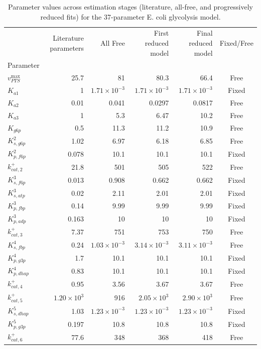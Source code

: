 \begin{table}
\caption{Parameter values across estimation stages (literature, all-free, and progressively reduced fits) for the 37-parameter E. coli glycolysis model.}
\label{tab:param_evolution}
\begin{tabular}{lrrrrc}
\toprule
 & Literature parameters & All Free & First reduced model & Final reduced model & Fixed/Free \\
Parameter &  &  &  &  &  \\
\midrule
$v^{\max}_{PTS}$ & 25.7 & 81 & 80.3 & 66.4 & Free \\
$K_{a1}$ & 1 & $1.71 \times 10^{-3}$ & $1.71 \times 10^{-3}$ & $1.71 \times 10^{-3}$ & Fixed \\
$K_{a2}$ & 0.01 & 0.041 & 0.0297 & 0.0817 & Free \\
$K_{a3}$ & 1 & 5.3 & 6.47 & 10.2 & Free \\
$K_{g6p}$ & 0.5 & 11.3 & 11.2 & 10.9 & Free \\
$K_{s,g6p}^{2}$ & 1.02 & 6.97 & 6.18 & 6.85 & Free \\
$K_{p,f6p}^{2}$ & 0.078 & 10.1 & 10.1 & 10.1 & Fixed \\
$k^{+}_{cat,2}$ & 21.8 & 501 & 505 & 522 & Free \\
$K_{s,f6p}^{3}$ & 0.013 & 0.908 & 0.662 & 0.662 & Fixed \\
$K_{s,atp}^{3}$ & 0.02 & 2.11 & 2.01 & 2.01 & Fixed \\
$K_{p,fbp}^{3}$ & 0.14 & 9.99 & 9.99 & 9.99 & Fixed \\
$K_{p,adp}^{3}$ & 0.163 & 10 & 10 & 10 & Fixed \\
$k^{+}_{cat,3}$ & 7.37 & 751 & 753 & 750 & Free \\
$K_{s,fbp}^{4}$ & 0.24 & $1.03 \times 10^{-3}$ & $3.14 \times 10^{-3}$ & $3.11 \times 10^{-3}$ & Free \\
$K_{p,g3p}^{4}$ & 1.7 & 10.1 & 10.1 & 10.1 & Fixed \\
$K_{p,dhap}^{4}$ & 0.83 & 10.1 & 10.1 & 10.1 & Fixed \\
$k^{+}_{cat,4}$ & 0.95 & 3.56 & 3.67 & 3.67 & Free \\
$k^{+}_{cat,5}$ & $1.20 \times 10^{3}$ & 916 & $2.05 \times 10^{3}$ & $2.90 \times 10^{3}$ & Free \\
$K_{s,dhap}^{5}$ & 1.03 & $1.23 \times 10^{-3}$ & $1.23 \times 10^{-3}$ & $1.23 \times 10^{-3}$ & Fixed \\
$K_{p,g3p}^{5}$ & 0.197 & 10.8 & 10.8 & 10.8 & Fixed \\
$k^{+}_{cat,6}$ & 77.6 & 348 & 368 & 418 & Free \\

\end{tabular}
\end{table}
